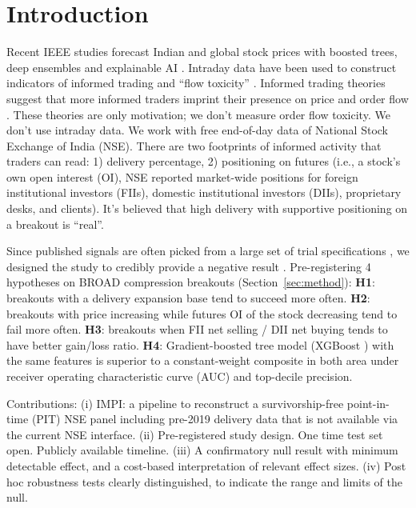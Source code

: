 \documentclass[conference]{IEEEtran}
\begin{document}
\section{Introduction}
Recent IEEE studies forecast Indian and global stock prices with boosted trees, deep ensembles and
explainable AI \cite{samantaray2026,singh2025,kumar2025,rajagopal2026}. Intraday data have been used to construct indicators of informed trading and ``flow toxicity''
\cite{easley1996,easley2012}. Informed trading theories suggest that more informed traders imprint their
presence on price and order flow \cite{kyle1985,glosten1985}. These theories are only motivation; we don't
measure order flow toxicity. We don't use intraday data. We work with free end-of-day data of National Stock
Exchange of India (NSE). There are two footprints of informed activity that traders can read: 1) delivery
percentage, 2) positioning on futures (i.e., a stock's own open interest (OI), NSE reported market-wide positions
for foreign institutional investors (FIIs), domestic institutional investors (DIIs), proprietary desks, and
clients). It's believed that high delivery with supportive positioning on a breakout is ``real''.

Since published signals are often picked from a large set of trial specifications
\cite{harvey2016,bailey2014pseudo}, we designed the study to credibly provide a negative result
\cite{nosek2018}. Pre-registering 4 hypotheses on BROAD compression breakouts (Section~\ref{sec:method}):
\textbf{H1}: breakouts with a delivery expansion base tend to succeed more often. \textbf{H2}: breakouts with
price increasing while futures OI of the stock decreasing tend to fail more often. \textbf{H3}: breakouts when
FII net selling / DII net buying tends to have better gain/loss ratio. \textbf{H4}: Gradient-boosted tree model
(XGBoost \cite{chen2016}) with the same features is superior to a constant-weight composite in both area under
receiver operating characteristic curve (AUC) and top-decile precision.

Contributions: (i) IMPI: a pipeline to reconstruct a survivorship-free point-in-time (PIT) NSE panel including
pre-2019 delivery data that is not available via the current NSE interface. (ii) Pre-registered study design.
One time test set open. Publicly available timeline. (iii) A confirmatory null result with minimum detectable
effect, and a cost-based interpretation of relevant effect sizes. (iv) Post hoc robustness tests clearly
distinguished, to indicate the range and limits of the null.
\end{document}
